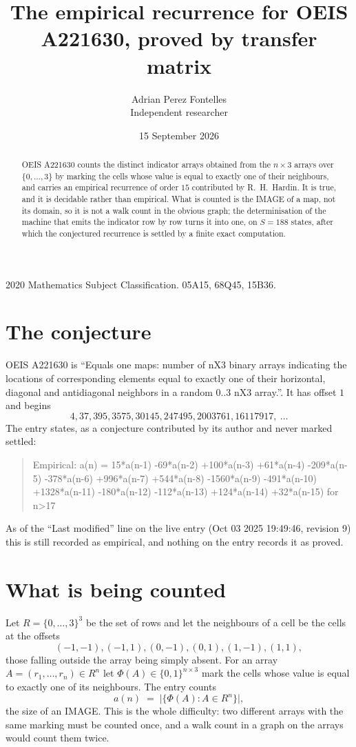 \documentclass[11pt,a4paper]{article}
\title{The empirical recurrence for OEIS A221630, proved by transfer matrix}
\author{Adrian Perez Fontelles\\ \small Independent researcher}
\date{15 September 2026}
\theoremstyle{plain}
\theoremstyle{definition}
\begin{document}
\maketitle

\begin{abstract}
OEIS A221630 counts the distinct indicator arrays obtained from the $n\times3$ arrays over
$\{0,\dots,3\}$ by marking the cells whose value is equal to exactly one of their neighbours, and carries an
empirical recurrence of order $15$ contributed by R.~H.~Hardin. It is true, and it is
decidable rather than empirical. What is counted is the IMAGE of a map, not its domain, so it
is not a walk count in the obvious graph; the determinisation of the machine that emits the
indicator row by row turns it into one, on $S=188$ states, after which the conjectured
recurrence is settled by a finite exact computation.
\end{abstract}

\noindent\small 2020 Mathematics Subject Classification. 05A15, 68Q45, 15B36.\normalsize

\section{The conjecture}

OEIS A221630 is ``Equals one maps: number of nX3 binary arrays indicating the locations of corresponding elements equal to exactly one of their horizontal, diagonal and antidiagonal neighbors in a random 0..3 nX3 array.''. It has offset $1$ and begins
\[
4, 37, 395, 3575, 30145, 247495, 2003761, 16117917,\ \dots
\]
The entry states, as a conjecture contributed by its author and never marked settled:
\begin{quote}
Empirical: a(n) = 15*a(n-1) -69*a(n-2) +100*a(n-3) +61*a(n-4) -209*a(n-5) -378*a(n-6) +996*a(n-7) +544*a(n-8) -1560*a(n-9) -491*a(n-10) +1328*a(n-11) -180*a(n-12) -112*a(n-13) +124*a(n-14) +32*a(n-15) for n>17
\end{quote}
As of the ``Last modified'' line on the live entry (Oct 03 2025 19:49:46, revision 9) this is still
recorded as empirical, and nothing on the entry records it as proved.

\section{What is being counted}

Let $R=\{0,\dots,3\}^{3}$ be the set of rows and let the neighbours of a cell be the
cells at the offsets
\[
(-1,-1), (-1,1), (0,-1), (0,1), (1,-1), (1,1),
\]
those falling outside the array being simply absent. For an array
$A=(r_1,\dots,r_n)\in R^n$ let $\Phi(A)\in\{0,1\}^{n\times3}$ mark the cells whose value
is equal to exactly one of its neighbours. The entry counts
\[
a(n)\;=\;\bigl|\{\Phi(A):A\in R^n\}\bigr| ,
\]
the size of an IMAGE. This is the whole difficulty: two different arrays with the same marking
must be counted once, and a walk count in a graph on the arrays would count them twice.
\end{document}
